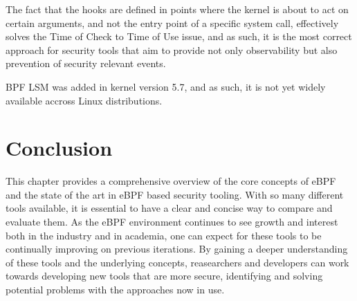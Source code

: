 The fact that the hooks are defined in points where the kernel is about to act on certain arguments, and not the entry point of a specific system call, effectively solves the Time of Check to Time of Use issue, and as such, it is the most correct approach for security tools that aim to provide not only observability but also prevention of security relevant events.

BPF LSM was added in kernel version 5.7, and as such, it is not yet widely available accross Linux distributions.

\section{Conclusion}
This chapter provides a comprehensive overview of the core concepts of eBPF and the state of the art in eBPF based security tooling. With so many different tools available, it is essential to have a clear and concise way to compare and evaluate them. As the eBPF environment continues to see growth and interest both in the industry and in academia, one can expect for these tools to be continually improving on previous iterations. By gaining a deeper understanding of these tools and the underlying concepts, reasearchers and developers can work towards developing new tools that are more secure, identifying and solving potential problems with the approaches now in use.
